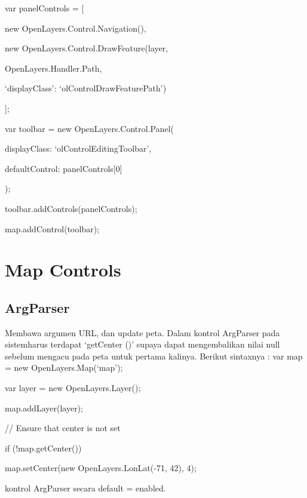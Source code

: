 var panelControls = [

new OpenLayers.Control.Navigation(),

new OpenLayers.Control.DrawFeature(layer,

OpenLayers.Handler.Path,

{‘displayClass’: ‘olControlDrawFeaturePath’})

];

var toolbar = new OpenLayers.Control.Panel({

displayClass: ‘olControlEditingToolbar’,

defaultControl: panelControls[0]

});

toolbar.addControls(panelControls);

map.addControl(toolbar);


\section{Map Controls}
\subsection{ArgParser}
 
Membawa argumen URL, dan update peta.
Dalam kontrol ArgParser pada sistemharus terdapat ‘getCenter ()’ supaya dapat mengembalikan nilai null sebelum mengacu pada peta untuk pertama kalinya. 
Berikut sintaxnya :
var map = new OpenLayers.Map(‘map’);

var layer = new OpenLayers.Layer();

map.addLayer(layer);

// Ensure that center is not set

if (!map.getCenter()) {

map.setCenter(new OpenLayers.LonLat(-71, 42), 4);

}

kontrol ArgParser secara default = enabled.





